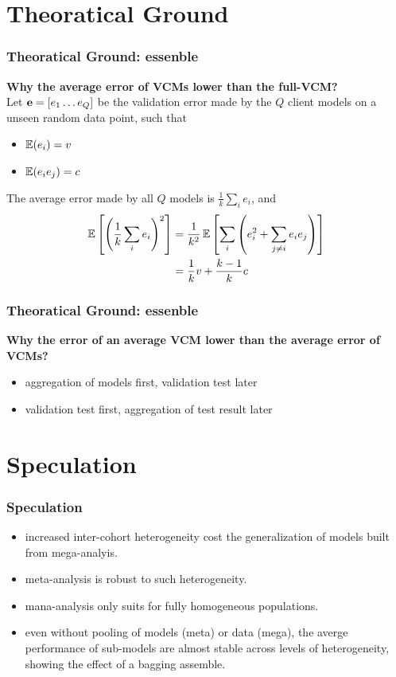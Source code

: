 \documentclass{beamer}
\begin{document}
\section{Theoratical Ground}
\begin{frame} \frametitle{Theoratical Ground: essenble}%
  \textbf{Why the average error of VCMs lower than the full-VCM?} \\
  Let $\mathbf{e}=[e_1 \dots e_Q]$ be the validation error made by the $Q$
  client models on a unseen random data point, such that
  \begin{itemize}
  \item $\operatorname{\mathbb{E}}(e_i) = v$
  \item $\operatorname{\mathbb{E}}(e_i e_j) = c$
  \end{itemize}
  The average error made by all $Q$ models is $\frac{1}{k}\sum_i e_i$,
  and
  \begin{align}
    \operatorname{\mathbb{E}}\left[ \left(\frac{1}{k}\sum_i e_i\right)^2 \right]
    &= \frac{1}{k^2}\operatorname{\mathbb{E}}\left[\sum_i \left(e_i^2 + \sum_{j \ne i}e_ie_j \right)  \right] \\
    &= \frac{1}{k}v + \frac{k-1}{k}c
  \end{align}
\end{frame}
\begin{frame} \frametitle{Theoratical Ground: essenble}%
  \textbf{Why the error of an average VCM lower than the average error of VCMs?} \\
  \begin{itemize}
  \item aggregation of models first, validation test later
  \item validation test first, aggregation of test result later
  \end{itemize}
\end{frame}
\section{Speculation}
\begin{frame}
  \frametitle{Speculation}
  \begin{itemize}
  \item increased inter-cohort heterogeneity cost the generalization
    of models built from mega-analyis.
  \item meta-analysis is robust to such heterogeneity.
  \item mana-analysis only suits for fully homogeneous populations.
  \item even without pooling of models (meta) or data (mega), the
    averge performance of sub-models are almost stable across levels
    of heterogeneity, showing the effect of a bagging assemble.
  \end{itemize}
\end{frame}
\end{document}
